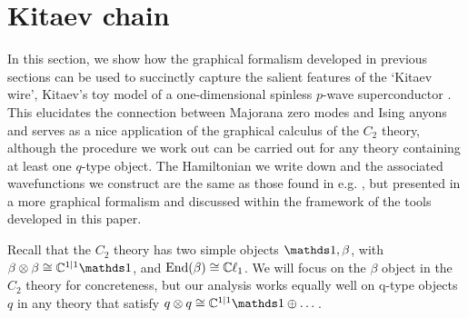 
\section{Kitaev chain} \label{kitaev_wire}

In this section, we show how the graphical formalism developed in previous sections
can be used to succinctly capture the salient features of the `Kitaev wire', 
Kitaev's toy model of a one-dimensional spinless $p$-wave superconductor \cite{kitaev2001}. 
This elucidates the connection between Majorana zero modes and Ising anyons and serves 
as a nice application of the graphical calculus of the $C_2$ theory, although the procedure we work 
out can be carried out for any theory containing at least one $q$-type object.
The Hamiltonian we write down and the associated wavefunctions we construct are 
the same as those found in e.g. \cite{fidkowski2011}, but presented in a more graphical formalism and 
discussed within the framework of the tools developed in this paper. 

Recall that the $C_2$ theory has two simple objects $\unit,\beta$,
with $\beta\tp \beta\cong \cc^{1|1}\unit$,
and $\text{End}(\beta) \cong \mathbb{C}\ell_1$.
We will focus on the $\beta$ object in the $C_2$ 
theory for concreteness, but our analysis works equally well on q-type objects $q$ in any theory that satisfy $q\tp q \cong \cc^{1|1} \unit \oplus \dots$.

